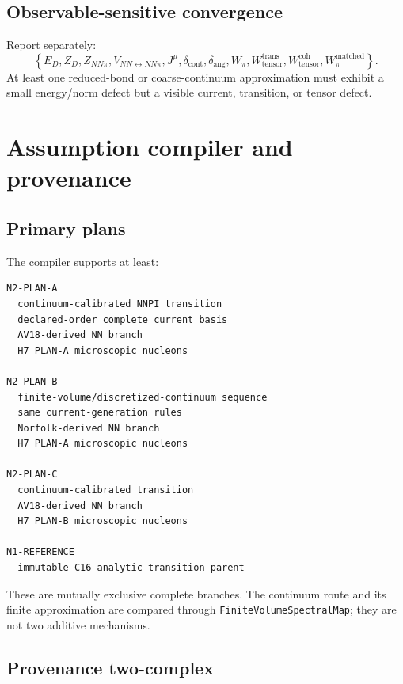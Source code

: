 \documentclass[11pt]{article}
\newcommand{\FiniteVolumeMap}{\texttt{FiniteVolume\allowbreak Spectral\allowbreak Map}}
\begin{document}
\subsection{Observable-sensitive convergence}

Report separately:
\begin{equation}
 \left\{
 E_D,
 Z_D,
 Z_{NN\pi},
 V_{NN\leftrightarrow NN\pi},
 J^\mu,
 \delta_{\mathrm{cont}},
 \delta_{\mathrm{ang}},
 W_{\pi},
 W_{\mathrm{tensor}}^{\mathrm{trans}},
 W_{\mathrm{tensor}}^{\mathrm{coh}},
 W_{\pi}^{\mathrm{matched}}
 \right\}.
 \label{eq:n2-convergence-observables}
\end{equation}
At least one reduced-bond or coarse-continuum approximation must exhibit a
small energy/norm defect but a visible current, transition, or tensor defect.

\section{Assumption compiler and provenance}
\label{sec:assumptions}

\subsection{Primary plans}

The compiler supports at least:
\begin{verbatim}
N2-PLAN-A
  continuum-calibrated NNPI transition
  declared-order complete current basis
  AV18-derived NN branch
  H7 PLAN-A microscopic nucleons

N2-PLAN-B
  finite-volume/discretized-continuum sequence
  same current-generation rules
  Norfolk-derived NN branch
  H7 PLAN-A microscopic nucleons

N2-PLAN-C
  continuum-calibrated transition
  AV18-derived NN branch
  H7 PLAN-B microscopic nucleons

N1-REFERENCE
  immutable C16 analytic-transition parent
\end{verbatim}
These are mutually exclusive complete branches.  The continuum route and its
finite approximation are compared through \FiniteVolumeMap; they are not two
additive mechanisms.

\subsection{Provenance two-complex}
\end{document}
